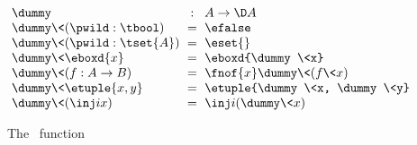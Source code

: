 \begin{figure*}
  \[\setlength\arraycolsep{.3em}\begin{array}{lcl}
    \dummy &:& A \to \D A\\
    \dummy \<(\pwild : \tbool) &=& \efalse\\
    \dummy \<(\pwild : \tset{A}) &=& \eset{}\\
    \dummy \<\eboxd{x} &=& \eboxd{\dummy\<x}\\
    \dummy \<(f : A \to B) &=& \fnof{x} \dummy\<(f\<x)\\
    \dummy \<\etuple{x,y} &=& \etuple{\dummy\<x, \dummy\<y}\\
    \dummy \<(\inj i x) &=& \inj i (\dummy\<x)
  \end{array}\]
  \caption{The \dummy\ function}
  \label{fig:dummy}
\end{figure*}
